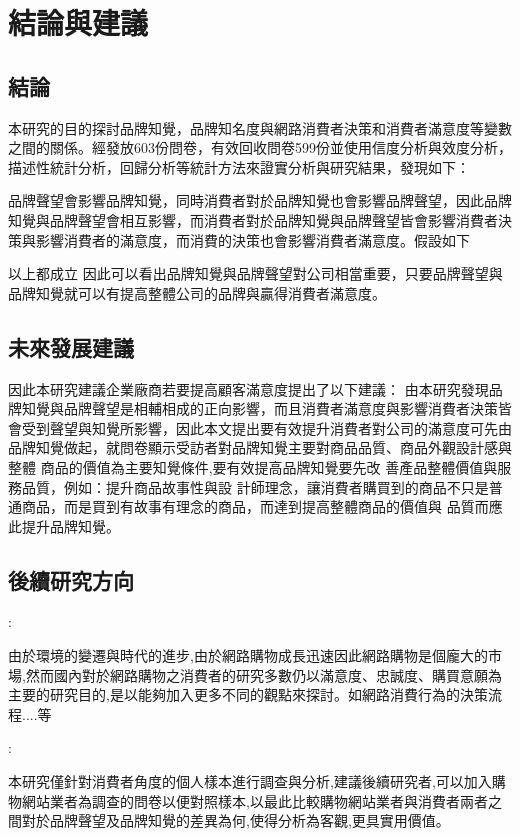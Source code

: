 \chapter{結論與建議}

\section{結論}
本研究的目的探討品牌知覺，品牌知名度與網路消費者決策和消費者滿意度等變數之間的關係。經發放603份問卷，有效回收問卷599份並使用信度分析與效度分析，描述性統計分析，回歸分析等統計方法來證實分析與研究結果，發現如下：

品牌聲望會影響品牌知覺，同時消費者對於品牌知覺也會影響品牌聲望，因此品牌知覺與品牌聲望會相互影響，而消費者對於品牌知覺與品牌聲望皆會影響消費者決策與影響消費者的滿意度，而消費的決策也會影響消費者滿意度。假設如下
\begin{enumerate}
\end{enumerate}
以上都成立
因此可以看出品牌知覺與品牌聲望對公司相當重要，只要品牌聲望與品牌知覺就可以有提高整體公司的品牌與贏得消費者滿意度。


\section{未來發展建議}

因此本研究建議企業廠商若要提高顧客滿意度提出了以下建議：
由本研究發現品牌知覺與品牌聲望是相輔相成的正向影響，而且消費者滿意度與影響消費者決策皆會受到聲望與知覺所影響，因此本文提出要有效提升消費者對公司的滿意度可先由品牌知覺做起，就問卷顯示受訪者對品牌知覺主要對商品品質、商品外觀設計感與整體 商品的價值為主要知覺條件,要有效提高品牌知覺要先改 善產品整體價值與服務品質，例如：提升商品故事性與設 計師理念，讓消費者購買到的商品不只是普通商品，而是買到有故事有理念的商品，而達到提高整體商品的價值與 品質而應此提升品牌知覺。
\section{後續研究方向}
\begin{enumerate}
:

  由於環境的變遷與時代的進步,由於網路購物成長迅速因此網路購物是個龐大的市場,然而國內對於網路購物之消費者的研究多數仍以滿意度、忠誠度、購買意願為主要的研究目的,是以能夠加入更多不同的觀點來探討。如網路消費行為的決策流程....等

:

  本研究僅針對消費者角度的個人樣本進行調查與分析,建議後續研究者,可以加入購物網站業者為調查的問卷以便對照樣本,以最此比較購物網站業者與消費者兩者之間對於品牌聲望及品牌知覺的差異為何,使得分析為客觀,更具實用價值。
\end{enumerate}
